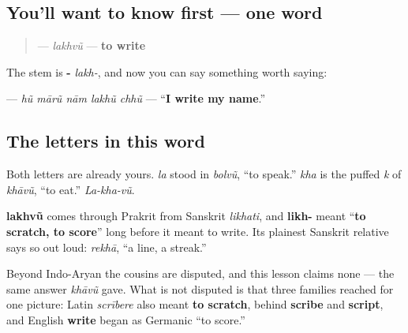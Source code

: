 \subsection*{You'll want to know first — one word}
\begin{quote}
\textbf{} — \emph{lakhvũ} — \textbf{to write}
\end{quote}

The stem is \textbf{-} \emph{lakh-}, and now you can say something worth saying:

\textbf{    } — \emph{hũ mārũ nām lakhũ chhũ} — \textquotedblleft{}\textbf{I write my name}.\textquotedblright{}

\subsection*{The letters in this word}
Both letters are already yours. \textbf{} \emph{la} stood in \emph{bolvũ}, \textquotedblleft{}to speak.\textquotedblright{} \textbf{} \emph{kha} is the puffed \emph{k} of \emph{khāvũ}, \textquotedblleft{}to eat.\textquotedblright{} \emph{La-kha-vũ}.

\begin{cousinweb}
\textbf{lakhvũ} comes through Prakrit from Sanskrit \emph{likhati}, and \textbf{likh-} meant \textquotedblleft{}\textbf{to scratch, to score}\textquotedblright{} long before it meant to write. Its plainest Sanskrit relative says so out loud: \textbf{} \emph{rekhā}, \textquotedblleft{}a line, a streak.\textquotedblright{}

Beyond Indo-Aryan the cousins are disputed, and this lesson claims none — the same answer \emph{khāvũ} gave. What is not disputed is that three families reached for one picture: Latin \emph{scrībere} also meant \textbf{to scratch}, behind \textbf{scribe} and \textbf{script}, and English \textbf{write} began as Germanic \textquotedblleft{}to score.\textquotedblright{}
\end{cousinweb}

